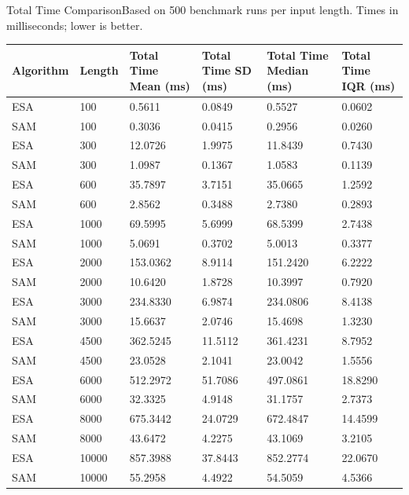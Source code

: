 \begin{benchmarktable}{Total Time Comparison}{Based on 500 benchmark runs per input length. Times in milliseconds; lower is better.}
\begin{tabularx}{\textwidth}{|X|X|X|X|X|X|}
\toprule
Algorithm & Length & Total Time Mean (ms) & Total Time SD (ms) & Total Time Median (ms) & Total Time IQR (ms) \\
\midrule
ESA & 100 & 0.5611 & 0.0849 & 0.5527 & 0.0602 \\
SAM & 100 & 0.3036 & 0.0415 & 0.2956 & 0.0260 \\
\hline
ESA & 300 & 12.0726 & 1.9975 & 11.8439 & 0.7430 \\
SAM & 300 & 1.0987 & 0.1367 & 1.0583 & 0.1139 \\
\hline
ESA & 600 & 35.7897 & 3.7151 & 35.0665 & 1.2592 \\
SAM & 600 & 2.8562 & 0.3488 & 2.7380 & 0.2893 \\
\hline
ESA & 1000 & 69.5995 & 5.6999 & 68.5399 & 2.7438 \\
SAM & 1000 & 5.0691 & 0.3702 & 5.0013 & 0.3377 \\
\hline
ESA & 2000 & 153.0362 & 8.9114 & 151.2420 & 6.2222 \\
SAM & 2000 & 10.6420 & 1.8728 & 10.3997 & 0.7920 \\
\hline
ESA & 3000 & 234.8330 & 6.9874 & 234.0806 & 8.4138 \\
SAM & 3000 & 15.6637 & 2.0746 & 15.4698 & 1.3230 \\
\hline
ESA & 4500 & 362.5245 & 11.5112 & 361.4231 & 8.7952 \\
SAM & 4500 & 23.0528 & 2.1041 & 23.0042 & 1.5556 \\
\hline
ESA & 6000 & 512.2972 & 51.7086 & 497.0861 & 18.8290 \\
SAM & 6000 & 32.3325 & 4.9148 & 31.1757 & 2.7373 \\
\hline
ESA & 8000 & 675.3442 & 24.0729 & 672.4847 & 14.4599 \\
SAM & 8000 & 43.6472 & 4.2275 & 43.1069 & 3.2105 \\
\hline
ESA & 10000 & 857.3988 & 37.8443 & 852.2774 & 22.0670 \\
SAM & 10000 & 55.2958 & 4.4922 & 54.5059 & 4.5366 \\
\bottomrule
\end{tabularx}
\end{benchmarktable}

